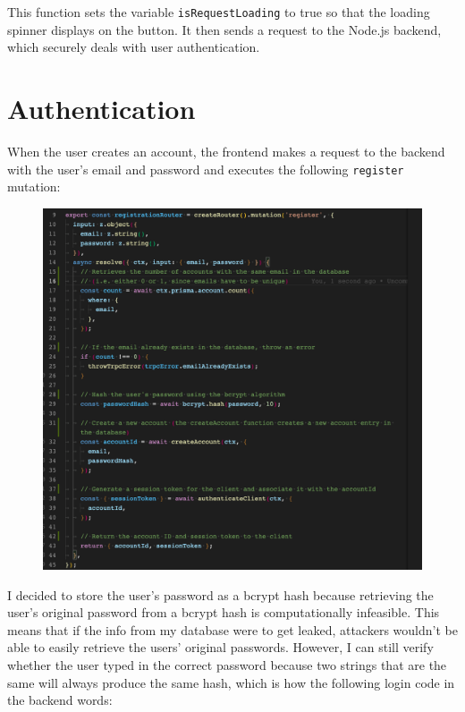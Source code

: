 \documentclass[notitlepage, 12pt]{report}
\newcommand{\code}[1]{\texttt{#1}}
\begin{document}
This function sets the variable \code{isRequestLoading} to true so that the loading spinner displays on the button. It then sends a request to the Node.js backend, which securely deals with user authentication.

\newpage

\section*{Authentication}

When the user creates an account, the frontend makes a request to the backend with the user's email and password and executes the following \code{register} mutation:

\begin{figure}[H]
	\centering
	\includegraphics[width=\textwidth]{registration-router.png}
\end{figure}

I decided to store the user's password as a bcrypt hash because retrieving the user's original password from a bcrypt hash is computationally infeasible. This means that if the info from my database were to get leaked, attackers wouldn't be able to easily retrieve the users' original passwords. However, I can still verify whether the user typed in the correct password because two strings that are the same will always produce the same hash, which is how the following login code in the backend words:
\end{document}
